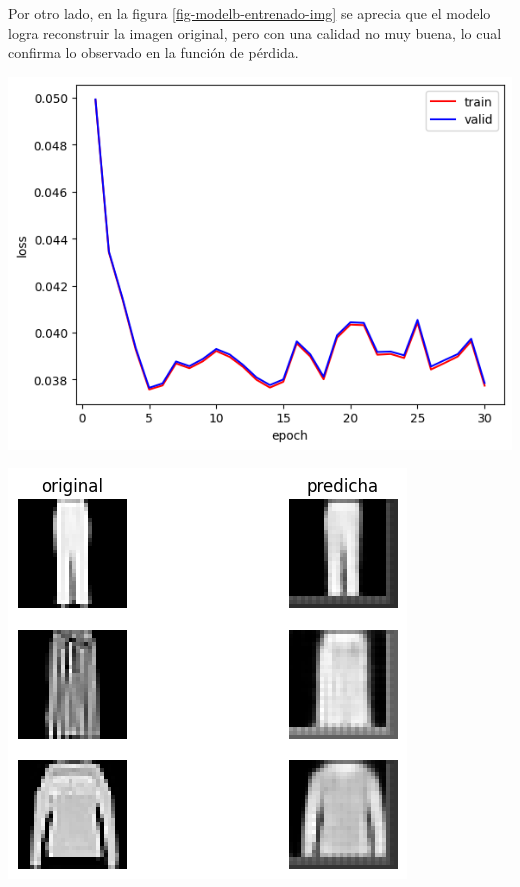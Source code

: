 \documentclass[aps,prl,reprint,groupedaddress]{revtex4-2}
\newenvironment{Figura}
  {\par\medskip\noindent\minipage{\linewidth}}
  {\endminipage\par\medskip}
\begin{document}
Por otro lado, en la figura \ref{fig-modelb-entrenado-img} se aprecia que el modelo 
logra reconstruir la imagen original, pero con una calidad no muy buena, lo cual 
confirma lo observado en la función de pérdida.

\begin{Figura}
  \centering
  \begin{minipage}[t]{0.58\linewidth}
    \centering
    \includegraphics[width=\textwidth]{figs1/modelo_original.png}
    \label{fig-modelb-entrenado-perdida}
  \end{minipage}%
  \hfill
  \begin{minipage}[t]{0.41\linewidth}
    \centering
    \includegraphics[width=\textwidth]{figs1/test_modelo_original.png}
    \label{fig-modelb-entrenado-img}
  \end{minipage}
\end{Figura}
\end{document}
